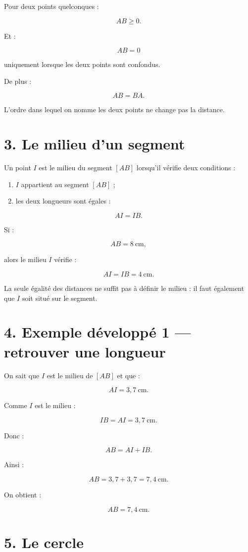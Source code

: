 Pour deux points quelconques :

\[
AB\ge0.
\]

Et :

\[
AB=0
\]

uniquement lorsque les deux points sont confondus.

De plus :

\[
AB=BA.
\]

L’ordre dans lequel on nomme les deux points ne change pas la distance.

\section{3. Le milieu d’un segment}

Un point $I$ est le milieu du segment $[AB]$ lorsqu’il vérifie deux conditions :

\begin{enumerate}
\item $I$ appartient au segment $[AB]$ ;
\item les deux longueurs sont égales :
\end{enumerate}

\[
AI=IB.
\]

Si :

\[
AB=8\ \text{cm},
\]

alors le milieu $I$ vérifie :

\[
AI=IB=4\ \text{cm}.
\]

La seule égalité des distances ne suffit pas à définir le milieu : il faut également que $I$ soit situé sur le segment.

\section{4. Exemple développé 1 — retrouver une longueur}

On sait que $I$ est le milieu de $[AB]$ et que :

\[
AI=3{,}7\ \text{cm}.
\]

Comme $I$ est le milieu :

\[
IB=AI=3{,}7\ \text{cm}.
\]

Donc :

\[
AB=AI+IB.
\]

Ainsi :

\[
AB=3{,}7+3{,}7=7{,}4\ \text{cm}.
\]

On obtient :

\[
\boxed{AB=7{,}4\ \text{cm}}.
\]

\section{5. Le cercle}


